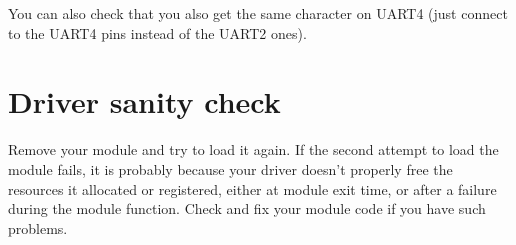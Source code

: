You can also check that you also get the same character on UART4
(just connect to the UART4 pins instead of the UART2 ones).

\section{Driver sanity check}

Remove your module and try to load it again. If the second attempt to
load the module fails, it is probably because your driver doesn't
properly free the resources it allocated or registered, either at module
exit time, or after a failure during the module  function. Check
and fix your module code if you have such problems.
